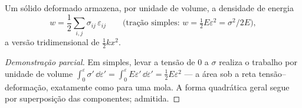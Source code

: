 \begin{proposition}\label{prop:b3:continuum-elasticity:energy}
Um sólido deformado armazena, por unidade de volume, a densidade de
energia
\[
w = \frac12\sum_{i,j}\sigma_{ij}\,\varepsilon_{ij}
\qquad\text{(tração simples: } w = \tfrac12 E\varepsilon^2 =
\sigma^2/2E\text{)} ,
\]
a versão tridimensional de $\tfrac12 kx^2$.
\end{proposition}

\begin{proof}[Demonstração parcial]
Em  simples, levar a tensão de $0$ a $\sigma$ realiza o trabalho
por unidade de volume $\int_0^\varepsilon\sigma'\,\dd\varepsilon' =
\int_0^\varepsilon E\varepsilon'\,\dd\varepsilon' = \tfrac12
E\varepsilon^2$ --- a área sob a reta tensão--deformação, exatamente
como para uma mola. A forma quadrática geral segue por superposição
das componentes; admitida.
\end{proof}

